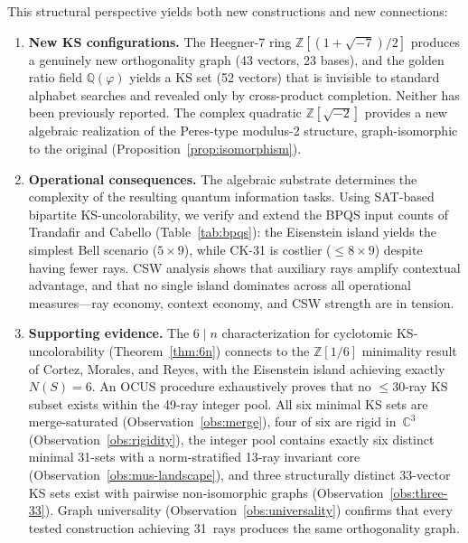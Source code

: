 \documentclass[12pt,a4paper]{article}
\newcommand{\C}{\mathbb{C}}
\newcommand{\Z}{\mathbb{Z}}
\newcommand{\Q}{\mathbb{Q}}
\begin{document}
This structural perspective yields both new constructions and new connections:

\begin{enumerate}
    \item \textbf{New KS configurations.} The Heegner-7 ring $\Z[(1+\sqrt{-7})/2]$ produces a genuinely new orthogonality graph (43 vectors, 23 bases), and the golden ratio field $\Q(\varphi)$ yields a KS set (52 vectors) that is invisible to standard alphabet searches and revealed only by cross-product completion. Neither has been previously reported. The complex quadratic $\Z[\sqrt{-2}]$ provides a new algebraic realization of the Peres-type modulus-2 structure, graph-isomorphic to the original (Proposition~\ref{prop:isomorphism}).

    \item \textbf{Operational consequences.} The algebraic substrate determines the complexity of the resulting quantum information tasks. Using SAT-based bipartite KS-uncolorability, we verify and extend the BPQS input counts of Trandafir and Cabello (Table~\ref{tab:bpqs}): the Eisenstein island yields the simplest Bell scenario ($5 \times 9$), while CK-31 is costlier ($\leq 8 \times 9$) despite having fewer rays. CSW analysis shows that auxiliary rays amplify contextual advantage, and that no single island dominates across all operational measures---ray economy, context economy, and CSW strength are in tension.

    \item \textbf{Supporting evidence.} The $6 \mid n$ characterization for cyclotomic KS-uncolorability (Theorem~\ref{thm:6n}) connects to the $\Z[1/6]$ minimality result of Cortez, Morales, and Reyes, with the Eisenstein island achieving exactly $N(S) = 6$.  An OCUS procedure exhaustively proves that no $\leq 30$-ray KS subset exists within the 49-ray integer pool.  All six minimal KS sets are merge-saturated (Observation~\ref{obs:merge}), four of six are rigid in~$\C^3$ (Observation~\ref{obs:rigidity}), the integer pool contains exactly six distinct minimal 31-sets with a norm-stratified 13-ray invariant core (Observation~\ref{obs:mus-landscape}), and three structurally distinct 33-vector KS sets exist with pairwise non-isomorphic graphs (Observation~\ref{obs:three-33}).  Graph universality (Observation~\ref{obs:universality}) confirms that every tested construction achieving 31~rays produces the same orthogonality graph.
\end{enumerate}
\end{document}

